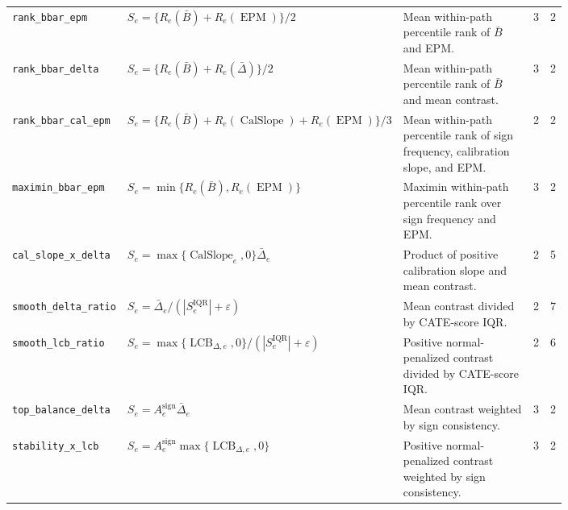 \begin{landscape}
\begin{longtable}{@{}p{0.175\linewidth}p{0.30\linewidth}p{0.32\linewidth}cc@{}}
\texttt{rank\_bbar\_epm} & \(S_e=\{R_e(\bar B)+R_e(\operatorname{EPM})\}/2\) & Mean within-path percentile rank of \(\bar B\) and EPM. & 3 & 2 \\
\texttt{rank\_bbar\_delta} & \(S_e=\{R_e(\bar B)+R_e(\bar\Delta)\}/2\) & Mean within-path percentile rank of \(\bar B\) and mean contrast. & 3 & 2 \\
\texttt{rank\_bbar\_cal\_epm} & \(S_e=\{R_e(\bar B)+R_e(\operatorname{CalSlope})+R_e(\operatorname{EPM})\}/3\) & Mean within-path percentile rank of sign frequency, calibration slope, and EPM. & 2 & 2 \\
\texttt{maximin\_bbar\_epm} & \(S_e=\min\{R_e(\bar B),R_e(\operatorname{EPM})\}\) & Maximin within-path percentile rank over sign frequency and EPM. & 3 & 2 \\
\texttt{cal\_slope\_x\_delta} & \(S_e=\max\{\operatorname{CalSlope}_e,0\}\bar\Delta_e\) & Product of positive calibration slope and mean contrast. & 2 & 5 \\
\texttt{smooth\_delta\_ratio} & \(S_e=\bar\Delta_e/(|S^{\mathrm{IQR}}_e|+\varepsilon)\) & Mean contrast divided by CATE-score IQR. & 2 & 7 \\
\texttt{smooth\_lcb\_ratio} & \(S_e=\max\{\operatorname{LCB}_{\Delta,e},0\}/(|S^{\mathrm{IQR}}_e|+\varepsilon)\) & Positive normal-penalized contrast divided by CATE-score IQR. & 2 & 6 \\
\texttt{top\_balance\_delta} & \(S_e=A^{\mathrm{sign}}_e\bar\Delta_e\) & Mean contrast weighted by sign consistency. & 3 & 2 \\
\texttt{stability\_x\_lcb} & \(S_e=A^{\mathrm{sign}}_e\max\{\operatorname{LCB}_{\Delta,e},0\}\) & Positive normal-penalized contrast weighted by sign consistency. & 3 & 2 \\
\end{longtable}
\end{landscape}
